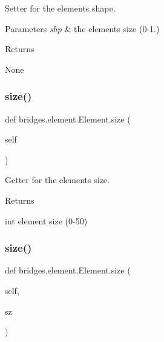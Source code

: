 Setter for the element\textquotesingle{}s shape. 


\begin{DoxyParams}{Parameters}
{\em shp} & the element\textquotesingle{}s size (0-\/1.) \\
\hline
\end{DoxyParams}
\begin{DoxyReturn}{Returns}


None 
\end{DoxyReturn}
\mbox{\label{classbridges_1_1element_1_1_element_a4d25b09a11a282c8c8147b16cd45c5bf}} 
\subsubsection{\texorpdfstring{size()}{size()}\hspace{0.1cm}{\footnotesize\ttfamily [1/2]}}
{\footnotesize\ttfamily def bridges.\+element.\+Element.\+size (\begin{DoxyParamCaption}\item[{}]{self }\end{DoxyParamCaption})}



Getter for the element\textquotesingle{}s size. 

\begin{DoxyReturn}{Returns}


int element size (0-\/50) 
\end{DoxyReturn}
\mbox{\label{classbridges_1_1element_1_1_element_afbb37ab4474c2ac1b7da950fb06819ed}} 
\subsubsection{\texorpdfstring{size()}{size()}\hspace{0.1cm}{\footnotesize\ttfamily [2/2]}}
{\footnotesize\ttfamily def bridges.\+element.\+Element.\+size (\begin{DoxyParamCaption}\item[{}]{self,  }\item[{}]{sz }\end{DoxyParamCaption})}



